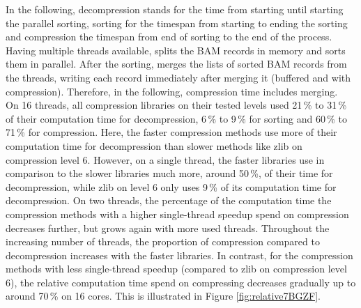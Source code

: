 In the following, decompression stands for the time from starting \sort until starting the parallel sorting, sorting for the timespan from starting to ending the sorting and compression the timespan from end of sorting to the end of the \sort process. Having multiple threads available, \sort splits the BAM records in memory and sorts them in parallel. After the sorting, \sort merges the lists of sorted BAM records from the threads, writing each record immediately after merging it (buffered and with compression). Therefore, in the following, compression time includes merging. \\
On 16 threads, all compression libraries on their tested levels used 21\,\% to 31\,\% of their computation time for decompression, 6\,\% to 9\,\% for sorting and 60\,\% to 71\,\% for compression. Here, the faster compression methods use more of their computation time for decompression than slower methods like zlib on compression level 6. However, on a single thread, the faster libraries use in comparison to the slower libraries much more, around 50\,\%, of their time for decompression, while zlib on level 6 only uses 9\,\% of its computation time for decompression. On two threads, the percentage of the computation time the compression methods with a higher single-thread speedup spend on compression decreases further, but grows again with more used threads. Throughout the increasing number of threads, the proportion of compression compared to decompression increases with the faster libraries. In contrast, for the compression methods with less single-thread speedup (compared to zlib on compression level 6), the relative computation time spend on compressing decreases gradually up to around 70\,\% on 16 cores. This is illustrated in Figure \ref{fig:relative7BGZF}.\\
